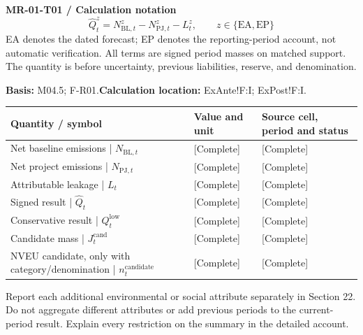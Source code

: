\par\begingroup\sffamily\fontsize{8.4}{10.5}\selectfont\color{NEBGreen}
\textbf{MR-01-T01 / Calculation notation}\
{\fontsize{10}{12}\selectfont\[\widehat Q_t^z=N_{\mathrm{BL},t}^z-N_{\mathrm{PJ},t}^z-L_t^z,\qquad z\in\{\mathrm{EA},\mathrm{EP}\}\]}
EA denotes the dated forecast; EP denotes the reporting-period account, not automatic verification. All terms are signed period masses on matched support. The quantity is before uncertainty, previous liabilities, reserve, and denomination.\par
\textbf{Basis:} M04.5; F-R01.\quad\textbf{Calculation location:} ExAnte!F:I; ExPost!F:I.\par\endgroup
{\sffamily\fontsize{8.6}{10.7}\selectfont\begin{longtable}{@{}P{48mm}P{61mm}P{53mm}@{}}
\toprule
\textbf{Quantity / symbol} & \textbf{Value and unit} & \textbf{Source cell, period and status}\\\midrule\endhead
\rule{0pt}{8mm}Net baseline emissions | $N_{\mathrm{BL},t}$ & [Complete] & [Complete]\\\hline
\rule{0pt}{8mm}Net project emissions | $N_{\mathrm{PJ},t}$ & [Complete] & [Complete]\\\hline
\rule{0pt}{8mm}Attributable leakage | $L_t$ & [Complete] & [Complete]\\\hline
\rule{0pt}{8mm}Signed result | $\widehat Q_t$ & [Complete] & [Complete]\\\hline
\rule{0pt}{8mm}Conservative result | $Q_t^{\mathrm{low}}$ & [Complete] & [Complete]\\\hline
\rule{0pt}{8mm}Candidate mass | $J_t^{\mathrm{cand}}$ & [Complete] & [Complete]\\\hline
\rule{0pt}{8mm}NVEU candidate, only with category/denomination | $n_t^{\mathrm{candidate}}$ & [Complete] & [Complete]\\\hline
\end{longtable}}
Report each additional environmental or social attribute separately in Section 22. Do not aggregate different attributes or add previous periods to the current-period result. Explain every restriction on the summary in the detailed account.\par
